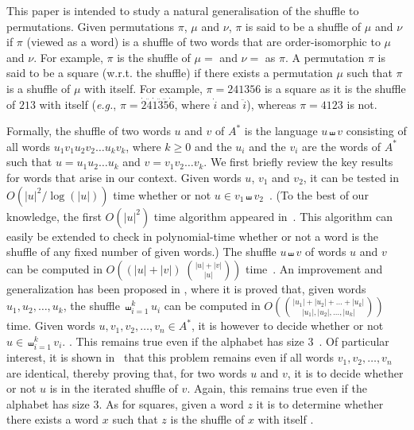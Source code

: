 \documentclass[a4paper]{llncs}
\begin{document}
This paper is intended to study a natural generalisation of the shuffle
to permutations.
Given permutations $\pi$, $\mu$ and $\nu$, $\pi$ is said to be a shuffle of
$\mu$ and $\nu$ if $\pi$ (viewed as a word) is a shuffle of two words that
are order-isomorphic to $\mu$ and $\nu$.
For example, $\pi$ is the shuffle
of $\mu=$ and $\nu=$ as
$\pi$.
A permutation $\pi$ is said to be a square (w.r.t. the shuffle) if there exists
a permutation $\mu$ such that $\pi$ is a shuffle of $\mu$ with itself.
For example, $\pi = 241356$ is a square as it is the shuffle of $213$ with itself
(\emph{e.g.},
$\pi = \dot{2}\ddot{4}\dot{1}\ddot{3}\ddot{5}\dot{6}$, where
$\dot{i}$ and $\ddot{i}$),
whereas $\pi = 4123$ is not.



Formally, the shuffle of two words $u$ and $v$ of $A^*$ is the language
$u \shuffle v$ consisting of all words
$u_1 v_1 u_2 v_2 \ldots u_k v_k$, where $k \geq 0$ and
the $u_i$ and the $v_i$ are the words  of $A^*$
such that $u = u_1 u_2 \ldots u_k$ and
$v = v_1 v_2 \ldots v_k$.
We first briefly review the key results for words
that arise in our context.
Given words $u$, $v_1$ and $v_2$, it can be tested in
$O\left(|u|^2 / \log(|u|)\right)$ time whether or not
$u \in v_1 \shuffle v_2$~\cite{Leeuwen:Nivat:IPL:1982}.
(To the best of our knowledge, the first
$O(|u|^2)$ time algorithm appeared in~\cite{Mansfield:DAM:1983}.
This algorithm can easily be extended to check in polynomial-time
whether or not a word is the shuffle of any fixed number of given words.)
The shuffle $u \shuffle v$ of words $u$ and $v$ can be computed in
$O\left((|u|+|v|) \; \binom{|u|+|v|}{|u|}\right)$
time~\cite{Spehner:TCS:1986}.
An improvement and generalization has been proposed in
\cite{Allauzen:IGM:2000}, where it is proved that,
given words $u_1, u_2, \ldots, u_k$, the shuffle
$\shuffle_{i=1}^{k} u_i$ can be computed in
$O\left(\binom{|u_1|+|u_2|+\ldots+|u_k|}{|u_1|,|u_2|,\ldots,|u_k|}\right)$ time.
Given words $u, v_1, v_2, \ldots, v_n \in A^*$, it is however \NPC to
decide whether or not
$u \in \shuffle_{i=1}^{k} v_i$.
\cite{Mansfield:DAM:1983,Warmuth:Haussler:JCSS:1984}.
This remains true even if the alphabet has size $3$~\cite{Warmuth:Haussler:JCSS:1984}.
Of particular interest,
it is shown in~\cite{Warmuth:Haussler:JCSS:1984} that this problem remains
\NPC even if all
words $v_1, v_2, \ldots, v_n$ are identical,
thereby proving that,
for two words $u$ and $v$, it is \NPC to decide whether or not $u$
is in the iterated shuffle of $v$.
Again, this remains true even if the alphabet has size $3$.
As for squares, given a word $z$ it is \NPC to determine whether
there exists a word $x$ such that $z$ is the shuffle of $x$ with itself
\cite{Buss:Soltys:2014,Rizzi:Vialette:CSR:2013}.
\end{document}
